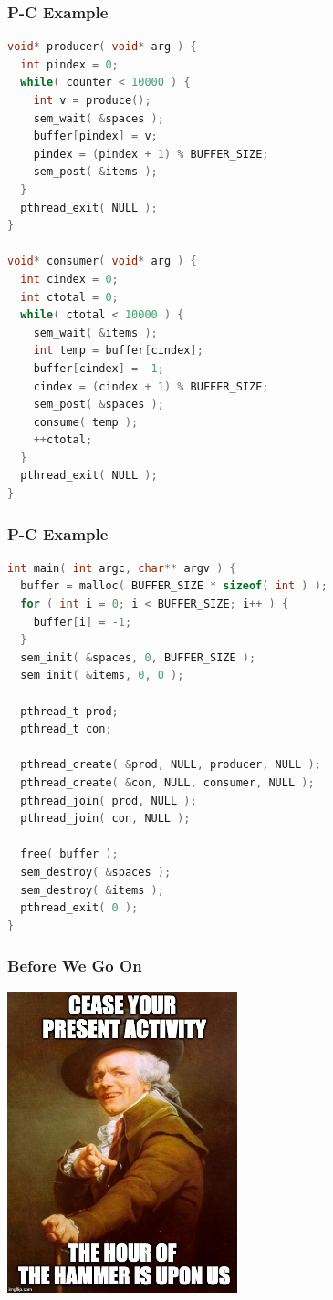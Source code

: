 \begin{frame}[fragile]
	\frametitle{P-C Example}

	\begin{lstlisting}[language=C]
void* producer( void* arg ) {
  int pindex = 0;
  while( counter < 10000 ) {
    int v = produce();
    sem_wait( &spaces );
    buffer[pindex] = v;
    pindex = (pindex + 1) % BUFFER_SIZE;
    sem_post( &items );
  }
  pthread_exit( NULL );
}

void* consumer( void* arg ) {
  int cindex = 0;
  int ctotal = 0;
  while( ctotal < 10000 ) {
    sem_wait( &items );
    int temp = buffer[cindex];
    buffer[cindex] = -1;
    cindex = (cindex + 1) % BUFFER_SIZE;
    sem_post( &spaces );
    consume( temp );
    ++ctotal;
  }
  pthread_exit( NULL );
}
\end{lstlisting}
\end{frame}

\begin{frame}[fragile]
	\frametitle{P-C Example}

	\begin{lstlisting}[language=C]
int main( int argc, char** argv ) {
  buffer = malloc( BUFFER_SIZE * sizeof( int ) );
  for ( int i = 0; i < BUFFER_SIZE; i++ ) {
    buffer[i] = -1;
  }  
  sem_init( &spaces, 0, BUFFER_SIZE );
  sem_init( &items, 0, 0 );

  pthread_t prod;
  pthread_t con;

  pthread_create( &prod, NULL, producer, NULL );
  pthread_create( &con, NULL, consumer, NULL );
  pthread_join( prod, NULL );
  pthread_join( con, NULL );

  free( buffer );
  sem_destroy( &spaces );
  sem_destroy( &items );
  pthread_exit( 0 );
}

\end{lstlisting}
\end{frame}


\begin{frame}
	\frametitle{Before We Go On}

	\begin{center}
		\includegraphics[width=0.5\textwidth]{images/stop-hammertime.jpg}
	\end{center}

\end{frame}


